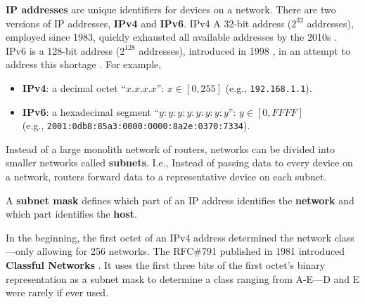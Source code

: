 \begin{Def}[IP Addressing]

    \textbf{IP addresses} are unique identifiers for devices on a network. 
    There are two versions of IP addresses, \textbf{IPv4} and \textbf{IPv6}.
    IPv4 A 32-bit address ($2^{32}$ addresses), employed since 1983, quickly exhausted all available addresses by the 2010s \cite{info12060246}.
    IPv6 is a 128-bit address ($2^{128}$ addresses), introduced in 1998 , in an attempt to address this shortage \cite{deering_ipv6_specification}\cite{ibm_ipv4_ipv6_formats}.
    For example,
    \begin{itemize}
        \item \textbf{IPv4}: a decimal octet ``$x.x.x.x$'': $x \in [0, 255]$ (e.g., \texttt{192.168.1.1}).
        \item \textbf{IPv6}: a hexadecimal segment ``$y:y:y:y:y:y:y:y$'': $y\in [0, FFFF]$ \\
         (e.g., \texttt{2001:0db8:85a3:0000:0000:8a2e:0370:7334}).
    \end{itemize}
\end{Def}

\newpage

\begin{Def}[Subnetting]

    Instead of a large monolith network of routers, networks can be divided into 
    smaller networks called \textbf{subnets}. I.e., Instead of passing data to every device on a network, routers forward data to a representative device on each subnet.
    \hfill \cite{cloudflare_subnet}
\end{Def}
\begin{Def}

    A \textbf{subnet mask} defines which part of an IP address identifies the \textbf{network} and which part identifies the \textbf{host}.
\end{Def}
\begin{Def}

    In the beginning, the first octet of an IPv4 address determined the network class---only allowing for 256 networks.
    The RFC\#791 published in 1981 introduced \textbf{Classful Networks} \cite{postel_internet_protocol}. 
    It uses the first three bits of the first octet's binary representation as a subnet mask to determine a class ranging from A-E---D and E were rarely if ever used.
\end{Def}

